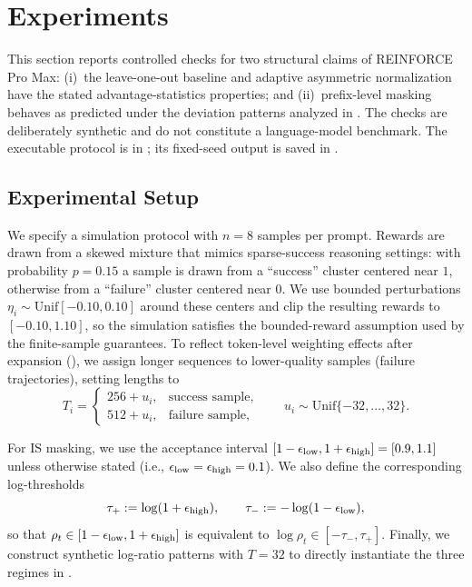 \section{Experiments}
\label{sec:experiments}

This section reports controlled checks for two structural claims of REINFORCE Pro Max: (i)~the leave-one-out baseline and adaptive asymmetric normalization have the stated advantage-statistics properties; and (ii)~prefix-level masking behaves as predicted under the deviation patterns analyzed in . The checks are deliberately synthetic and do not constitute a language-model benchmark. The executable protocol is in ; its fixed-seed output is saved in .

\subsection{Experimental Setup}

We specify a simulation protocol with $n=8$ samples per prompt. Rewards are drawn from a skewed mixture that mimics sparse-success reasoning settings: with probability $p=0.15$ a sample is drawn from a ``success'' cluster centered near $1$, otherwise from a ``failure'' cluster centered near $0$. We use bounded perturbations $\eta_i\sim\mathrm{Unif}[-0.10,0.10]$ around these centers and clip the resulting rewards to $[-0.10,1.10]$, so the simulation satisfies the bounded-reward assumption used by the finite-sample guarantees. To reflect token-level weighting effects after expansion (), we assign longer sequences to lower-quality samples (failure trajectories), setting lengths to
\[
    T_i = \begin{cases}
        256 + u_i, & \text{success sample},\\
        512 + u_i, & \text{failure sample},
    \end{cases}
    \qquad u_i \sim \mathrm{Unif}\{-32,\ldots,32\}.
\]

For IS masking, we use the acceptance interval $[1-\epsilon_{\mathrm{low}},1+\epsilon_{\mathrm{high}}]=[0.9,1.1]$ unless otherwise stated (i.e., $\epsilon_{\mathrm{low}}=\epsilon_{\mathrm{high}}=0.1$).
We also define the corresponding log-thresholds
\[
    \tau_+ := \log(1+\epsilon_{\mathrm{high}}),
    \qquad
    \tau_- := -\log(1-\epsilon_{\mathrm{low}}),
\]
so that $\rho_t \in [1-\epsilon_{\mathrm{low}},1+\epsilon_{\mathrm{high}}]$ is equivalent to $\log\rho_t \in [-\tau_-,\tau_+]$.
Finally, we construct synthetic log-ratio patterns with $T=32$ to directly instantiate the three regimes in .

